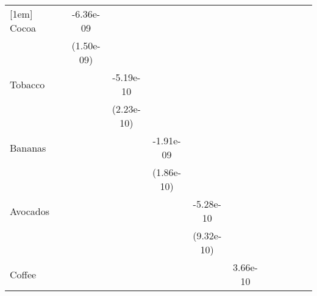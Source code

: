 \begin{table}[htbp]
\begin{tabular}{l*{11}{c}}
[1em]
Cocoa       &                     &   -6.36e-09\sym{***}&                     &                     &                     &                     &                     &                     &                     &                     &                     \\
            &                     &  (1.50e-09)         &                     &                     &                     &                     &                     &                     &                     &                     &                     \\
[1em]
Tobacco     &                     &                     &   -5.19e-10\sym{*}  &                     &                     &                     &                     &                     &                     &                     &                     \\
            &                     &                     &  (2.23e-10)         &                     &                     &                     &                     &                     &                     &                     &                     \\
[1em]
Bananas     &                     &                     &                     &   -1.91e-09\sym{***}&                     &                     &                     &                     &                     &                     &                     \\
            &                     &                     &                     &  (1.86e-10)         &                     &                     &                     &                     &                     &                     &                     \\
[1em]
Avocados    &                     &                     &                     &                     &   -5.28e-10         &                     &                     &                     &                     &                     &                     \\
            &                     &                     &                     &                     &  (9.32e-10)         &                     &                     &                     &                     &                     &                     \\
[1em]
Coffee      &                     &                     &                     &                     &                     &    3.66e-10         &                     &                     &                     &                     &                     \\

\end{tabular}
\end{table}
